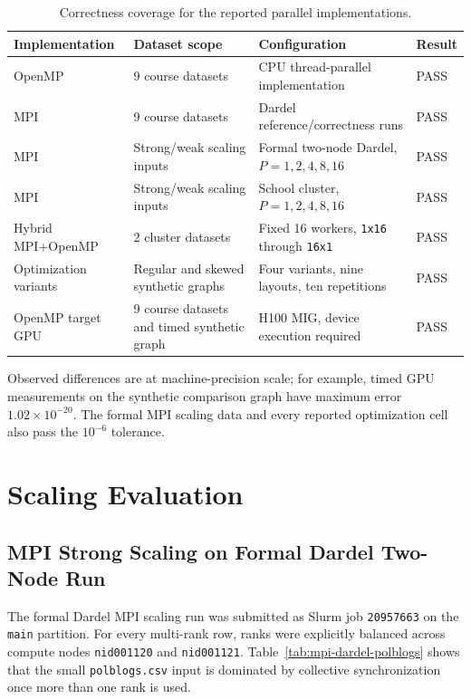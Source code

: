 \documentclass[11pt]{article}
\begin{document}
\begin{table}[H]
\centering
\caption{Correctness coverage for the reported parallel implementations.}
\label{tab:correctness-summary}
\scriptsize
\begin{tabular}{@{}p{}p{}p{}p{}@{}}
\toprule
Implementation & Dataset scope & Configuration & Result \\
\midrule
OpenMP & 9 course datasets & CPU thread-parallel implementation & PASS \\
MPI & 9 course datasets & Dardel reference/correctness runs & PASS \\
MPI & Strong/weak scaling inputs & Formal two-node Dardel, $P=1,2,4,8,16$ & PASS \\
MPI & Strong/weak scaling inputs & School cluster, $P=1,2,4,8,16$ & PASS \\
Hybrid MPI+OpenMP & 2 cluster datasets & Fixed 16 workers, \texttt{1x16} through \texttt{16x1} & PASS \\
Optimization variants & Regular and skewed synthetic graphs & Four variants, nine layouts, ten repetitions & PASS \\
OpenMP target GPU & 9 course datasets and timed synthetic graph & H100 MIG, device execution required & PASS \\
\bottomrule
\end{tabular}
\end{table}

Observed differences are at machine-precision scale; for example, timed
GPU measurements on the synthetic comparison graph have maximum error
$1.02\times10^{-20}$. The formal MPI scaling data and every reported
optimization cell also pass the $10^{-6}$ tolerance.

\section{Scaling Evaluation}
\label{sec:wang-scaling}

\subsection{MPI Strong Scaling on Formal Dardel Two-Node Run}
\label{subsec:mpi-dardel-strong}

The formal Dardel MPI scaling run was submitted as Slurm job
\texttt{20957663} on the \texttt{main} partition. For every multi-rank
row, ranks were explicitly balanced across compute nodes
\texttt{nid001120} and \texttt{nid001121}. Table~\ref{tab:mpi-dardel-polblogs}
shows that the small \texttt{polblogs.csv} input is dominated by
collective synchronization once more than one rank is used.
\end{document}
